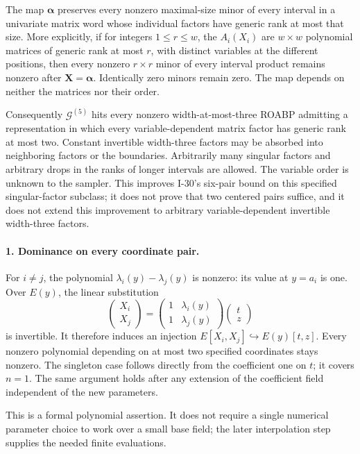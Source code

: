 The map $\boldsymbol\alpha$ preserves every nonzero maximal-size
minor of every interval in a univariate matrix word whose individual
factors have generic rank at most that size. More explicitly, if
for integers $1\le r\le w$, the $A_i(X_i)$ are $w\times w$
polynomial matrices of generic rank at
most $r$, with distinct variables at the different positions, then
every nonzero $r\times r$ minor of every interval product remains
nonzero after $\mathbf X=\boldsymbol\alpha$. Identically zero minors
remain zero. The map depends on neither the matrices nor their order.

Consequently $\mathcal G^{(5)}$ hits every nonzero width-at-most-three
ROABP admitting a representation in which every variable-dependent
matrix factor has generic rank at most two. Constant invertible
width-three factors may be absorbed into neighboring factors or
the boundaries. Arbitrarily many singular factors and arbitrary
drops in the ranks of longer intervals are allowed. The variable
order is unknown to the sampler. This improves I-30's six-pair bound
on this specified singular-factor subclass; it does not prove that
two centered pairs suffice, and it does not extend this improvement
to arbitrary variable-dependent invertible width-three factors.

\paragraph{1. Dominance on every coordinate pair.}
For $i\ne j$, the polynomial $\lambda_i(y)-\lambda_j(y)$ is nonzero:
its value at $y=a_i$ is one. Over $E(y)$, the linear substitution
\[
 \begin{pmatrix}X_i\\X_j\end{pmatrix}
 =\begin{pmatrix}1&\lambda_i(y)\\1&\lambda_j(y)\end{pmatrix}
   \begin{pmatrix}t\\z\end{pmatrix}
 \tag{I.85}
\]
is invertible. It therefore induces an injection
$E[X_i,X_j]\hookrightarrow E(y)[t,z]$. Every nonzero polynomial
depending on at most two specified coordinates stays nonzero.
The singleton case follows directly from the coefficient one on
$t$; it covers $n=1$. The same argument holds after any extension
of the coefficient field independent of the new parameters.

This is a formal polynomial assertion. It does not require a
single numerical parameter choice to work over a small base field;
the later interpolation step supplies the needed finite evaluations.

